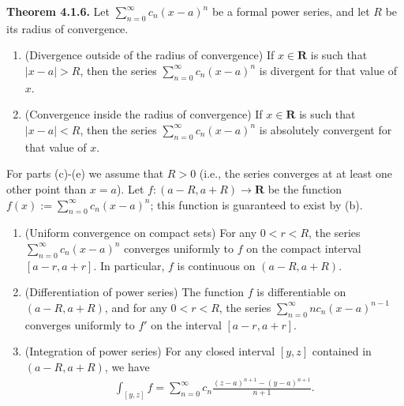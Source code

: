 \documentclass{book}
\newcommand{\titl}[1]{\noindent\textbf{#1}}
\begin{document}
\begin{framed}
\titl{Theorem 4.1.6.} Let $\sum_{n = 0}^{\infty} c_n(x - a)^n$ be a formal power series, and let $R$ be its radius of convergence.
\begin{enumerate}
    \item (Divergence outside of the radius of convergence) If $x \in \mathbf{R}$ is such that $|x - a| > R$, then the series $\sum_{n = 0}^{\infty} c_n(x - a)^n$ is divergent for that value of $x$.
    \item (Convergence inside the radius of convergence) If $x \in \mathbf{R}$ is such that $|x - a| < R$, then the series $\sum_{n = 0}^{\infty} c_n(x - a)^n$ is absolutely convergent for that value of $x$.
\end{enumerate}
For parts (c)-(e) we assume that $R > 0$ (i.e., the series converges at at least one other point than $x = a$). Let $f : (a - R, a + R) \to \mathbf{R}$ be the function $f(x) := \sum_{n = 0}^{\infty} c_n(x - a)^n$; this function is guaranteed to exist by (b).
\begin{enumerate}[start=3]
    \item (Uniform convergence on compact sets) For any $0 < r < R$, the series $\sum_{n = 0}^{\infty} c_n(x - a)^n$ converges uniformly to $f$ on the compact interval $[a - r, a + r]$. In particular, $f$ is continuous on $(a - R, a + R)$.
    \item (Differentiation of power series) The function $f$ is differentiable on $(a - R, a + R)$, and for any $0 < r < R$, the series $\sum_{n = 0}^{\infty} nc_n(x - a)^{n - 1}$ converges uniformly to $f'$ on the interval $[a - r, a + r]$.
    \item (Integration of power series) For any closed interval $[y, z]$ contained in $(a − R, a + R)$, we have
        \begin{align*}
            \int_{[y, z]} f = \sum_{n = 0}^{\infty} c_n\frac{(z - a)^{n + 1} - (y - a)^{n + 1}}{n + 1}.
        \end{align*}
\end{enumerate}
\end{framed}
\end{document}
